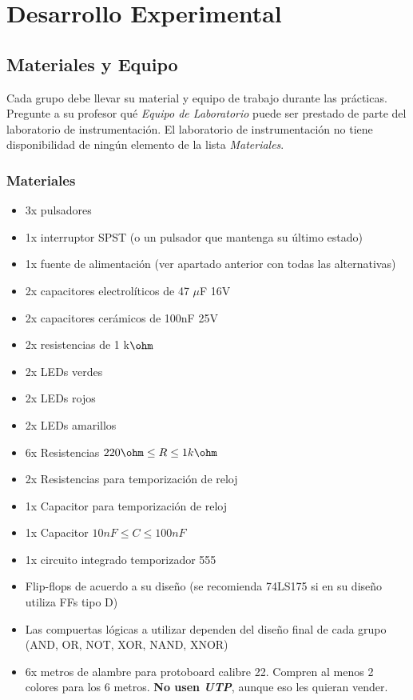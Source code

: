 
\section{Desarrollo Experimental}
\subsection{Materiales y Equipo}

Cada grupo debe llevar su material y equipo de trabajo durante las prácticas. Pregunte a su profesor qué \emph{Equipo de Laboratorio} puede ser prestado
de parte del laboratorio de instrumentación. El laboratorio de instrumentación no tiene disponibilidad de ningún elemento de la lista \emph{Materiales}.

\subsubsection*{Materiales}
\begin{itemize}
    \item 3x pulsadores
    \item 1x interruptor SPST (o un pulsador que mantenga su último estado)
    \item 1x fuente de alimentación (ver apartado anterior con todas las alternativas)
    \item 2x capacitores electrolíticos de 47 $\mu$F 16V
    \item 2x capacitores cerámicos de 100nF 25V
    \item 2x resistencias de 1 k$\ohm$
    \item 2x LEDs verdes
    \item 2x LEDs rojos
    \item 2x LEDs amarillos
    \item 6x Resistencias $220 \ohm \leq R \leq 1 k\ohm$
    \item 2x Resistencias para temporización de reloj
    \item 1x Capacitor para temporización de reloj
    \item 1x Capacitor $10nF \leq C \leq 100nF$
    \item 1x circuito integrado temporizador 555
    \item Flip-flops de acuerdo a su diseño (se recomienda 74LS175 si en su diseño utiliza FFs tipo D)
    \item Las compuertas lógicas a utilizar dependen del diseño final de cada grupo (AND, OR, NOT, XOR, NAND, XNOR)
    \item 6x metros de alambre para protoboard calibre 22. Compren al menos 2 colores para los 6 metros. \textbf{No usen \emph{UTP}}, aunque eso les quieran vender.
\end{itemize}


